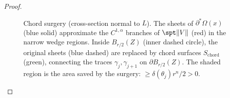 \begin{proof}
\begin{figure}[ht]
    \caption{Chord surgery (cross-section normal to $L$). The sheets of $\partial^*\Omega(x)$ (blue solid) approximate the $C^{1,\alpha}$ branches of $\spt\|V\|$ (red) in the narrow wedge regions. Inside $B_{r/2}(Z)$ (inner dashed circle), the original sheets (blue dashed) are replaced by chord surfaces $S_{\mathrm{chord}}$ (green), connecting the traces $\gamma_j, \gamma_{j+1}$ on $\partial B_{r/2}(Z)$. The shaded region is the area saved by the surgery: $\geq \delta(\theta_j) r^n / 2 > 0$.}
    \label{fig:surgery}
\end{figure}


\end{proof}

